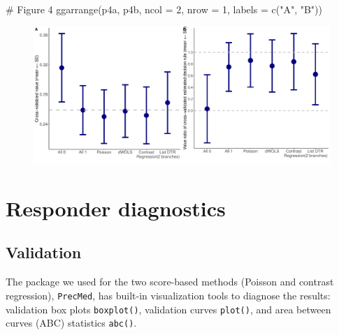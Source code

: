 \documentclass[
  letterpaper,
  DIV=11,
  numbers=noendperiod]{scrreprt}
\newenvironment{Shaded}{\begin{snugshade}}{\end{snugshade}}
\newcommand{\AttributeTok}[1]{\textcolor[rgb]{0.40,0.45,0.13}{#1}}
\newcommand{\CommentTok}[1]{\textcolor[rgb]{0.37,0.37,0.37}{#1}}
\newcommand{\DecValTok}[1]{\textcolor[rgb]{0.68,0.00,0.00}{#1}}
\newcommand{\FunctionTok}[1]{\textcolor[rgb]{0.28,0.35,0.67}{#1}}
\newcommand{\NormalTok}[1]{\textcolor[rgb]{0.00,0.23,0.31}{#1}}
\newcommand{\StringTok}[1]{\textcolor[rgb]{0.13,0.47,0.30}{#1}}
\begin{document}
\begin{Shaded}
\begin{Highlighting}[]
\CommentTok{\# Figure 4}
\FunctionTok{ggarrange}\NormalTok{(p4a, p4b, }\AttributeTok{ncol =} \DecValTok{2}\NormalTok{, }\AttributeTok{nrow =} \DecValTok{1}\NormalTok{, }\AttributeTok{labels =} \FunctionTok{c}\NormalTok{(}\StringTok{"A"}\NormalTok{, }\StringTok{"B"}\NormalTok{))}
\end{Highlighting}
\end{Shaded}

\begin{figure}[H]

{\centering \includegraphics{chapter_18_files/figure-pdf/value-1.pdf}

}

\end{figure}

\hypertarget{responder-diagnostics}{%
\section{Responder diagnostics}\label{responder-diagnostics}}

\hypertarget{validation}{%
\subsection{Validation}\label{validation}}

The package we used for the two score-based methods (Poisson and
contrast regression), \texttt{PrecMed}, has built-in visualization tools
to diagnose the results: validation box plots \texttt{boxplot()},
validation curves \texttt{plot()}, and area between curves (ABC)
statistics \texttt{abc()}.
\end{document}
